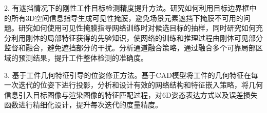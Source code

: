 \documentclass[12pt]{article}
\begin{document}



2. 有遮挡情况下的刚性工件目标检测精度提升方法。研究如何利用目标边界框中的所有3D空间信息指导生成可见性掩膜，避免场景元素遮挡下掩膜不可用的问题。研究如何使用可见性掩膜指导网络训练时对候选目标的抽样，同时研究如何充分利用刚体的局部特征获得的先验知识，使网络的训练和推理过程由刚体可见部分监督和融合，避免遮挡部分的干扰。分析通道融合策略，通过融合多个可靠局部区域的预测结果，提升工件整体检测的准确度。



3. 基于工件几何特征引导的位姿修正方法。基于CAD模型将工件的几何特征在每一次迭代的位姿下进行投影，分析和设计有效的网络结构和特征嵌入策略，将几何信息引入目标图像与渲染图像的特征匹配过程，对6D姿态表达方式以及误差损失函数进行精细化设计，提升每次迭代的度量精度。
\end{document}

